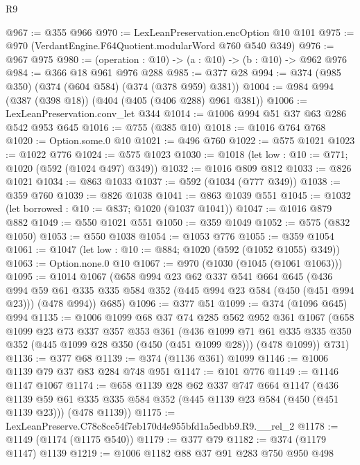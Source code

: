 \begin{lexlean}{R9}
\begin{coremodule}
@967 := @355 @966
@970 := LexLeanPreservation.encOption @10 @101
@975 := @970 (VerdantEngine.F64Quotient.modularWord @760 @540 @349)
@976 := @967 @975
@980 := (operation : @10) -> (a : @10) -> (b : @10) -> @962 @976
@984 := @366 @18 @961 @976 @288
@985 := @377 @28
@994 := @374 (@985 @350) (@374 (@604 @584) (@374 (@378 @959) @381))
@1004 := @984 @994 (@387 (@398 @18)) (@404 (@405 (@406 @288) @961 @381))
@1006 := LexLeanPreservation.conv_let @344
@1014 := @1006 @994 @51 @37 @63 @286 @542 @953 @645
@1016 := @755 (@385 @10)
@1018 := @1016 @764 @768
@1020 := Option.some.{0} @10
@1021 := @496 @760
@1022 := @575 @1021
@1023 := @1022 @776
@1024 := @575 @1023
@1030 := @1018 (let low : @10 := @771; @1020 (@592 (@1024 @497) @349))
@1032 := @1016 @809 @812
@1033 := @826 @1021
@1034 := @863 @1033
@1037 := @592 (@1034 (@777 @349))
@1038 := @359 @760
@1039 := @826 @1038
@1041 := @863 @1039 @551
@1045 := @1032 (let borrowed : @10 := @837; @1020 (@1037 @1041))
@1047 := @1016 @879 @882
@1049 := @550 @1021 @551
@1050 := @359 @1049
@1052 := @575 (@832 @1050)
@1053 := @550 @1038
@1054 := @1053 @776
@1055 := @359 @1054
@1061 := @1047 (let low : @10 := @884; @1020 (@592 (@1052 @1055) @349))
@1063 := Option.none.{0} @10
@1067 := @970 (@1030 (@1045 (@1061 @1063)))
@1095 := @1014
    @1067
    (@658
      @994
      @23
      @62
      @337
      @541
      @664
      @645
      (@436
        @994
        @59
        @61
        @335
        @335
        @584
        @352
        (@445 @994 @23 @584 (@450 (@451 @994 @23)))
        (@478 @994))
      @685)
@1096 := @377 @51
@1099 := @374 (@1096 @645) @994
@1135 := @1006
    @1099
    @68
    @37
    @74
    @285
    @562
    @952
    @361
    @1067
    (@658
      @1099
      @23
      @73
      @337
      @357
      @353
      @361
      (@436
        @1099
        @71
        @61
        @335
        @335
        @350
        @352
        (@445 @1099 @28 @350 (@450 (@451 @1099 @28)))
        (@478 @1099))
      @731)
@1136 := @377 @68
@1139 := @374 (@1136 @361) @1099
@1146 := @1006 @1139 @79 @37 @83 @284 @748 @951
@1147 := @101 @776
@1149 := @1146 @1147 @1067
@1174 := @658
    @1139
    @28
    @62
    @337
    @747
    @664
    @1147
    (@436
      @1139
      @59
      @61
      @335
      @335
      @584
      @352
      (@445 @1139 @23 @584 (@450 (@451 @1139 @23)))
      (@478 @1139))
@1175 := LexLeanPreserve.C78c8ce54f7eb170d4e955bfd1a5edbb9.R9.__rel_2
@1178 := @1149 (@1174 (@1175 @540))
@1179 := @377 @79
@1182 := @374 (@1179 @1147) @1139
@1219 := @1006
    @1182
    @88
    @37
    @91
    @283
    @750
    @950
    @498

\end{coremodule}
\end{lexlean}
